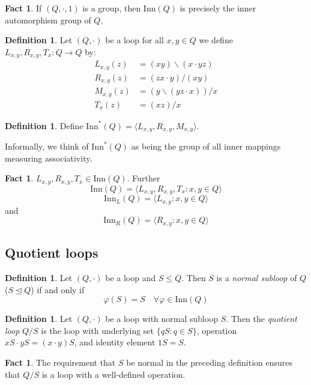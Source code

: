 \documentclass[12pt, twoside, openright]{report}
\theoremstyle{definition}
\newtheorem{fct}[thm]{Fact}
\newtheorem{dfn}[thm]{Definition}
\newcommand{\ldv}{\backslash}       %
\newcommand{\rdv}{/}                %
\newcommand{\inn}{\text{Inn}}       %
\begin{document}
\begin{fct}
  If $(Q, \cdot, 1)$ is a group, then $\inn(Q)$ is precisely the inner automorphism group of $Q$.
\end{fct}

\begin{dfn}
  Let $(Q, \cdot)$ be a loop for all $x, y\in Q$ we define $L_{x, y}, R_{x, y}, T_x: Q\to Q$ by:
  \begin{align*}
    L_{x, y}(z) &= (xy)\ldv(x\cdot yz)\\
    R_{x, y}(z) &= (zx\cdot y)\rdv(xy)\\
    M_{x, y}(z) &= (y\ldv(yz\cdot x))\rdv x\\
    T_x(z) &= (xz)\rdv x
  \end{align*}
\end{dfn}

\begin{dfn}
  Define $\inn^*(Q) = \langle L_{x, y}, R_{x, y}, M_{x, y}\rangle$.\
\end{dfn}

Informally, we think of $\inn^*(Q)$ as being the group of all inner mappings measuring associativity.

\begin{fct}
  $L_{x, y}, R_{x, y}, T_x\in \inn(Q)$. Further
  \[\inn(Q) = \langle L_{x, y}, R_{x, y}, T_x : x, y\in Q\rangle\]
  \[\inn_L(Q) = \langle L_{x, y} : x, y\in Q\rangle\] and
  \[\inn_R(Q) = \langle R_{x, y} : x, y\in Q\rangle\]
\end{fct}

\subsection{Quotient loops}

\begin{dfn}
  Let $(Q, \cdot)$ be a loop and $S\leq Q$. Then $S$ is a \emph{normal subloop} of $Q$ ($S\unlhd Q$) if and only if
  \[\varphi(S) = S\quad\forall\varphi\in \inn(Q)\]
\end{dfn}

\begin{dfn}
  Let $(Q, \cdot)$ be a loop with normal subloop $S$. Then the \emph{quotient loop} $Q/S$ is the loop with underlying
    set $\{qS : q\in S\}$, operation $xS\cdot yS = (x\cdot y) S$, and identity element $1S = S$.
\end{dfn}

\begin{fct}
  The requirement that $S$ be normal in the preceding definition ensures that $Q/S$ is a loop with a well-defined operation.
\end{fct}
\end{document}
